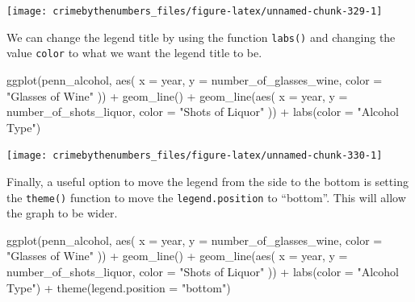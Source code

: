 \documentclass[
]{krantz}
\makeatletter
\newenvironment{Shaded}{\begin{snugshade}}{\end{snugshade}}
\newcommand{\AttributeTok}[1]{\textcolor[rgb]{0.61,0.61,0.61}{#1}}
\newcommand{\FunctionTok}[1]{\textcolor[rgb]{0,0,0}{#1}}
\newcommand{\NormalTok}[1]{#1}
\newcommand{\SpecialCharTok}[1]{\textcolor[rgb]{0,0,0}{#1}}
\newcommand{\StringTok}[1]{\textcolor[rgb]{0.5,0.5,0.5}{#1}}
\newenvironment{kframe}{%
\medskip{}
\setlength{\fboxsep}{.8em}
 \def\at@end@of@kframe{}%
 \ifinner\ifhmode%
  \def\at@end@of@kframe{\end{minipage}}%
  \begin{minipage}{\columnwidth}%
 \fi\fi%
 \def\FrameCommand##1{\hskip\@totalleftmargin \hskip-\fboxsep
 \colorbox{shadecolor}{##1}\hskip-\fboxsep
     \hskip-\linewidth \hskip-\@totalleftmargin \hskip\columnwidth}%
 \MakeFramed {\advance\hsize-\width
   \@totalleftmargin\z@ \linewidth\hsize
   \@setminipage}}%
 {\par\unskip\endMakeFramed%
 \at@end@of@kframe}
\renewenvironment{Shaded}{\begin{kframe}}{\end{kframe}}
\makeatother
\begin{document}
\begin{center}\texttt{[image: crimebythenumbers\_files/figure-latex/unnamed-chunk-329-1]} \end{center}

We can change the legend title by using the function
\texttt{labs()} and changing the value \texttt{color} to
what we want the legend title to be.

\begin{Shaded}
\begin{Highlighting}[]
\FunctionTok{ggplot}\NormalTok{(penn\_alcohol, }\FunctionTok{aes}\NormalTok{(}
  \AttributeTok{x =}\NormalTok{ year,}
  \AttributeTok{y =}\NormalTok{ number\_of\_glasses\_wine,}
  \AttributeTok{color =} \StringTok{"Glasses of Wine"}
\NormalTok{)) }\SpecialCharTok{+}
  \FunctionTok{geom\_line}\NormalTok{() }\SpecialCharTok{+}
  \FunctionTok{geom\_line}\NormalTok{(}\FunctionTok{aes}\NormalTok{(}
    \AttributeTok{x =}\NormalTok{ year,}
    \AttributeTok{y =}\NormalTok{ number\_of\_shots\_liquor,}
    \AttributeTok{color =} \StringTok{"Shots of Liquor"}
\NormalTok{  )) }\SpecialCharTok{+}
  \FunctionTok{labs}\NormalTok{(}\AttributeTok{color =} \StringTok{"Alcohol Type"}\NormalTok{)}
\end{Highlighting}
\end{Shaded}

\begin{center}\texttt{[image: crimebythenumbers\_files/figure-latex/unnamed-chunk-330-1]} \end{center}

Finally, a useful option to move the legend from the side to
the bottom is setting the \texttt{theme()} function to move
the \texttt{legend.position} to ``bottom''. This will allow
the graph to be wider.

\begin{Shaded}
\begin{Highlighting}[]
\FunctionTok{ggplot}\NormalTok{(penn\_alcohol, }\FunctionTok{aes}\NormalTok{(}
  \AttributeTok{x =}\NormalTok{ year,}
  \AttributeTok{y =}\NormalTok{ number\_of\_glasses\_wine,}
  \AttributeTok{color =} \StringTok{"Glasses of Wine"}
\NormalTok{)) }\SpecialCharTok{+}
  \FunctionTok{geom\_line}\NormalTok{() }\SpecialCharTok{+}
  \FunctionTok{geom\_line}\NormalTok{(}\FunctionTok{aes}\NormalTok{(}
    \AttributeTok{x =}\NormalTok{ year,}
    \AttributeTok{y =}\NormalTok{ number\_of\_shots\_liquor,}
    \AttributeTok{color =} \StringTok{"Shots of Liquor"}
\NormalTok{  )) }\SpecialCharTok{+}
  \FunctionTok{labs}\NormalTok{(}\AttributeTok{color =} \StringTok{"Alcohol Type"}\NormalTok{) }\SpecialCharTok{+}
  \FunctionTok{theme}\NormalTok{(}\AttributeTok{legend.position =} \StringTok{"bottom"}\NormalTok{)}
\end{Highlighting}
\end{Shaded}
\end{document}

